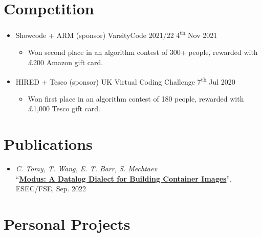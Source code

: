   \section{Competition}

  \begin{itemize}
    \item Showcode + ARM (sponsor) \dashdiv{} VarsityCode 2021/22 \dashdiv{} 4\textsuperscript{th} Nov 2021
    \begin{itemize}
      \item Won second place in an algorithm contest of 300+ people, rewarded with £200 Amazon gift card.
    \end{itemize}
    \item HIRED + Tesco (sponsor) \dashdiv{} UK Virtual Coding Challenge \dashdiv{} 7\textsuperscript{th} Jul 2020
    \begin{itemize}
      \item Won first place in an algorithm contest of 180 people, rewarded with £1,000 Tesco gift card.
    \end{itemize}
  \end{itemize}

  \section{Publications}

  \begin{itemize}
    \item \textit{C. Tomy, T. Wang, E. T. Barr, S. Mechtaev} \\
    ``\textbf{\href{https://2022.esec-fse.org/details/fse-2022-research-papers/55/Modus-A-Datalog-Dialect-for-Building-Container-Images}{\color{link}Modus: A Datalog Dialect for Building Container Images}}'', ESEC/FSE, Sep. 2022
  \end{itemize}

  \section{Personal Projects}

